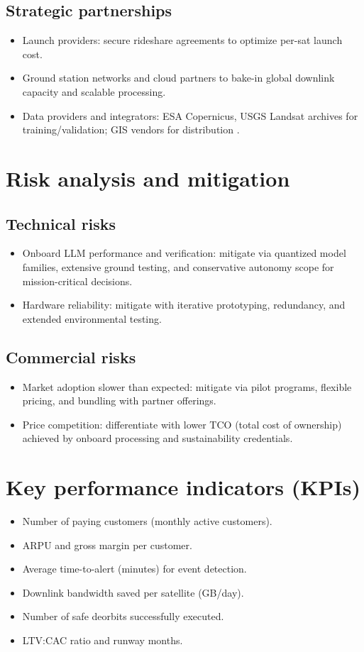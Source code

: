 \subsection{Strategic partnerships}
\begin{itemize}
  \item Launch providers: secure rideshare agreements to optimize per-sat launch cost.
  \item Ground station networks and cloud partners to bake-in global downlink capacity and scalable processing.
  \item Data providers and integrators: ESA Copernicus, USGS Landsat archives for training/validation; GIS vendors for distribution \parencite{copernicus,earthexplorer}.
\end{itemize}

\section{Risk analysis and mitigation}
\subsection{Technical risks}
\begin{itemize}
  \item Onboard LLM performance and verification: mitigate via quantized model families, extensive ground testing, and conservative autonomy scope for mission-critical decisions.
  \item Hardware reliability: mitigate with iterative prototyping, redundancy, and extended environmental testing.
\end{itemize}

\subsection{Commercial risks}
\begin{itemize}
  \item Market adoption slower than expected: mitigate via pilot programs, flexible pricing, and bundling with partner offerings.
  \item Price competition: differentiate with lower TCO (total cost of ownership) achieved by onboard processing and sustainability credentials.
\end{itemize}

\section{Key performance indicators (KPIs)}
\begin{itemize}
  \item Number of paying customers (monthly active customers).
  \item ARPU and gross margin per customer.
  \item Average time-to-alert (minutes) for event detection.
  \item Downlink bandwidth saved per satellite (GB/day).
  \item Number of safe deorbits successfully executed.
  \item LTV:CAC ratio and runway months.
\end{itemize}

